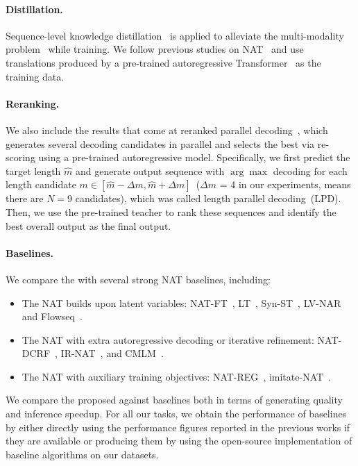 \paragraph{Distillation.}
Sequence-level knowledge distillation~\citep{hinton2015distilling} is applied to alleviate the multi-modality problem~\cite{nat} while training. 
We follow previous studies on NAT~\citep{nat,iter_nat,imitate_nat} and use translations produced by a pre-trained autoregressive Transformer~\cite{transformer} as the training data.


\paragraph{Reranking.}
We also include the results that come at reranked parallel decoding~\citep{nat,enat,nat_reg,imitate_nat}, which generates several decoding candidates in parallel and selects the best via re-scoring using a pre-trained autoregressive model. 
Specifically, we first predict the target length $\hat{m}$ and generate output sequence with $\arg\max$ decoding for each length candidate $m \in [\hat{m}-\Delta m, \hat{m}+\Delta m ]$~($\Delta m$ = 4 in our experiments, means there are $N=9$ candidates), which was called length parallel decoding~(LPD). 
Then, we use the pre-trained teacher to rank these sequences and identify the best overall output as the final output.

\paragraph{Baselines.}
We compare the \method with several strong NAT baselines, including:
\begin{itemize}
    \item The NAT builds upon latent variables: NAT-FT~\cite{nat}, LT~\cite{lt}, Syn-ST~\cite{syn_st}, LV-NAR~\cite{lv_nar} and Flowseq~\cite{flowseq}.
    \item The NAT with extra autoregressive decoding or iterative refinement: NAT-DCRF~\cite{nat_crf}, IR-NAT~\cite{iter_nat}, and CMLM~\cite{cmlm}.
    \item The NAT with auxiliary training objectives: NAT-REG~\cite{nat_reg}, imitate-NAT~\cite{imitate_nat}.
\end{itemize}
We compare the proposed \method against baselines both in terms of generating quality and inference speedup. 
For all our tasks, we obtain the performance of baselines by either directly using the performance figures reported in the previous works if they are available or producing them by using the open-source implementation of baseline algorithms on our datasets. 

